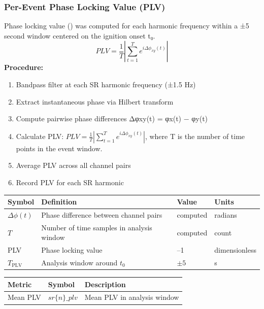 \documentclass[11pt,a4paper]{article}
\begin{document}
\subsubsection{Per-Event Phase Locking Value (PLV)}
Phase locking value (\cite{lachaux1999plv}) was computed for each harmonic frequency within a ±5 second window centered on the ignition onset t₀.
\begin{displaymath}
PLV = \frac{1}{T}\left|\sum_{t=1}^{T} e^{i\Delta\phi_{xy}(t)}\right|
\end{displaymath}
\textbf{Procedure:}
\begin{enumerate}
\item Bandpass filter at each SR harmonic frequency (±1.5 Hz)
\item Extract instantaneous phase via Hilbert transform
\item Compute pairwise phase differences Δφxy(t) = φx(t) − φy(t)
\item Calculate PLV: $PLV = \frac{1}{T}\left|\sum_{t=1}^{T} e^{i\Delta\phi_{xy}(t)}\right|$, where T is the number of time points in the event window.\item Average PLV across all channel pairs
\item Record PLV for each SR harmonic
\end{enumerate}
\begin{table}[H]
    \centering
    \begin{tabular}{>{\centering\arraybackslash}m{2cm} m{6cm} >{\centering\arraybackslash}m{2cm} >{\centering\arraybackslash}m{2.5cm}}
        \hline
        \textbf{Symbol} & \textbf{Definition} & \textbf{Value} & \textbf{Units} \\
        \hline
        $\Delta\phi(t)$ & Phase difference between channel pairs & computed & radians \\
        $T$ & Number of time samples in analysis window & computed & count \\
        PLV & Phase locking value & 0--1 & dimensionless \\
        $T_{\mathrm{PLV}}$ & Analysis window around $t_{0}$ & $\pm 5$ & s \\
        \hline
    \end{tabular}
\end{table}
\begin{table}[h]
    \centering
    \begin{tabular}{lll}
        \hline
        Metric & Symbol & Description \\
        \hline
        Mean PLV & $sr\{n\}\_{plv}$ & Mean PLV in analysis window \\
        \hline
    \end{tabular}
\end{table}
\end{document}
